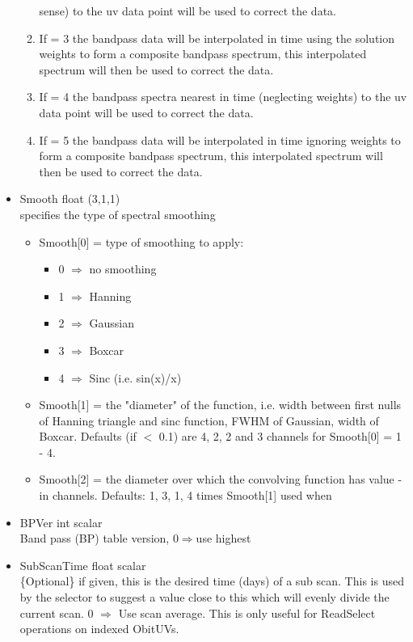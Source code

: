 \documentclass[11pt]{report}
\begin{document}
\begin{itemize}
\begin{enumerate}
sense) to the uv data point will be used to correct the data. 
\item If = 3 the bandpass data will be interpolated in time using the
solution weights to form a composite bandpass spectrum, this
interpolated spectrum will then be used to correct the data.
\item If = 4 the bandpass spectra nearest in time (neglecting weights)
to the uv data point will be used to correct the data.
\item If = 5 the bandpass data will be interpolated in time ignoring
weights to form a composite bandpass spectrum, this interpolated
spectrum will then be used to correct the data. 
\end{enumerate}
\item  Smooth  float (3,1,1) \\
specifies the type of spectral smoothing
\begin{itemize}
 \item  Smooth[0] = type of smoothing to apply:
\begin{itemize}
\item 0 $\Rightarrow$ no smoothing
\item 1 $\Rightarrow$ Hanning
\item 2 $\Rightarrow$ Gaussian
\item 3 $\Rightarrow$ Boxcar
\item 4 $\Rightarrow$ Sinc (i.e. sin(x)/x)
\end{itemize}
\item Smooth[1] = the "diameter" of the function, i.e. width between
first nulls of Hanning triangle  and sinc function, FWHM of Gaussian,
width of Boxcar. Defaults (if $<$ 0.1) are 4, 2, 2 and 3 channels for
Smooth[0] = 1 - 4. 
\item Smooth[2] = the diameter over which the convolving function has
value - in channels. Defaults: 1, 3, 1, 4 times Smooth[1] used when
\end{itemize}
\item  BPVer   int scalar \\ 
Band pass (BP) table version, $0 \Rightarrow $use highest
\item SubScanTime float scalar \\
\{Optional\} if given, this is the desired time (days) of a sub scan.  
This is used by the selector to suggest a value close to this which will
evenly divide the current scan.  0 $\Rightarrow$ Use scan average.
This is only useful for ReadSelect operations on indexed ObitUVs.
\end{itemize}
\end{document}
